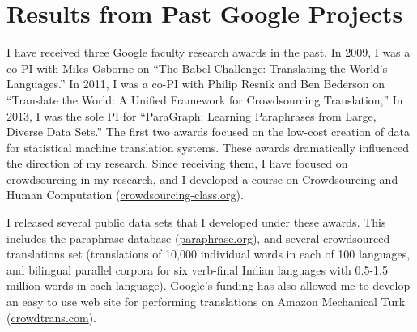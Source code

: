 \documentclass[11pt]{article}
\begin{document}
\section{Results from Past Google Projects}

I have received three Google faculty research awards in the past. In 2009, I was a co-PI with Miles Osborne on ``The Babel Challenge: Translating the World's Languages.''  In 2011, I was a co-PI with Philip Resnik and Ben Bederson on ``Translate the World: A Unified Framework for Crowdsourcing Translation,'' In 2013, I was the sole PI for ``ParaGraph: Learning Paraphrases from Large, Diverse Data   Sets.''  The first two awards focused on the low-cost creation of data for statistical machine translation systems.  These awards dramatically influenced the direction of my research.  Since receiving them, I have focused on crowdsourcing in my research, and I developed a course on Crowdsourcing and Human Computation (\url{crowdsourcing-class.org}).

I released several public data sets that I developed under these awards.  This includes the paraphrase database (\url{paraphrase.org}), and several crowdsourced translations set (translations of 10,000 individual words in each of 100 languages, and bilingual parallel corpora for six verb-final Indian languages with 0.5-1.5 million words in each language). Google's funding has also allowed me to develop an easy to use web site for performing translations on Amazon Mechanical Turk  (\url{crowdtrans.com}). 





\end{document}
